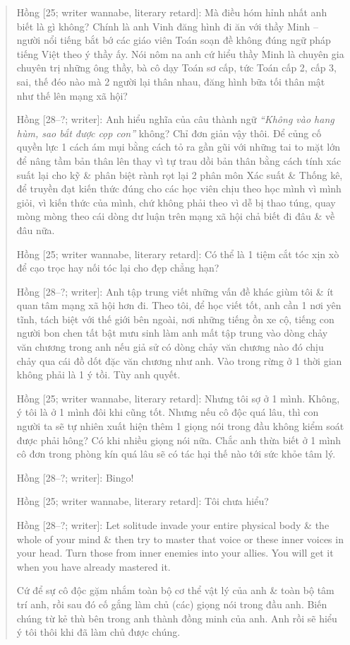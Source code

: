 \documentclass[12pt]{article}
\begin{document}
\begin{quote}
	{\sf Hồng [25; writer wannabe, literary retard]}: Mà điều hóm hỉnh nhất anh biết là gì không? Chính là anh Vinh đăng hình đi ăn với thầy Minh -- người nổi tiếng bắt bớ các giáo viên Toán soạn đề không đúng ngữ pháp tiếng Việt theo ý thầy ấy. Nói nôm na anh cứ hiểu thầy Minh là chuyên gia chuyên trị những ông thầy, bà cô dạy Toán sơ cấp, tức Toán cấp 2, cấp 3, sai, thế đéo nào mà 2 người lại thân nhau, đăng hình bữa tối thân mật như thế lên mạng xã hội?
	
	{\sf Hồng [28--?; writer]}: Anh hiểu nghĩa của câu thành ngữ {\it ``Không vào hang hùm, sao bắt được cọp con''} không? Chỉ đơn giản vậy thôi. Để củng cố quyền lực 1 cách ám mụi bằng cách tỏ ra gần gũi với những tai to mặt lớn để nâng tầm bản thân lên thay vì tự trau dồi bản thân bằng cách tính xác suất lại cho kỹ \& phân biệt rành rọt lại 2 phân môn Xác suất \& Thống kê, để truyền đạt kiến thức đúng cho các học viên chịu theo học mình vì mình giỏi, vì kiến thức của mình, chứ không phải theo vì dễ bị thao túng, quay mòng mòng theo cái dòng dư luận trên mạng xã hội chả biết đi đâu \& về đâu nữa.
	
	{\sf Hồng [25; writer wannabe, literary retard]}: Có thể là 1 tiệm cắt tóc xịn xò để cạo trọc hay nối tóc lại cho đẹp chẳng hạn?
	
	{\sf Hồng [28--?; writer]}: Anh tập trung viết những vấn đề khác giùm tôi \& ít quan tâm mạng xã hội hơn đi. Theo tôi, để học viết tốt, anh cần 1 nơi yên tĩnh, tách biệt với thế giới bên ngoài, nơi những tiếng ồn xe cộ, tiếng con người bon chen tất bật mưu sinh làm anh mất tập trung vào dòng chảy văn chương trong anh nếu giả sử có dòng chảy văn chương nào đó chịu chảy qua cái đồ dốt đặc văn chương như anh. Vào trong rừng ở 1 thời gian không phải là 1 ý tồi. Tùy anh quyết.
	
	{\sf Hồng [25; writer wannabe, literary retard]}: Nhưng tôi sợ ở 1 mình. Không, ý tôi là ở 1 mình đôi khi cũng tốt. Nhưng nếu cô độc quá lâu, thì con người ta sẽ tự nhiên xuất hiện thêm 1 giọng nói trong đầu không kiểm soát được phải hông? Có khi nhiều giọng nói nữa. Chắc anh thừa biết ở 1 mình cô đơn trong phòng kín quá lâu sẽ có tác hại thế nào tới sức khỏe tâm lý.
	
	{\sf Hồng [28--?; writer]}: Bingo!
	
	{\sf Hồng [25; writer wannabe, literary retard]}: Tôi chưa hiểu?
	
	{\sf Hồng [28--?; writer]}: Let solitude invade your entire physical body \& the whole of your mind \& then try to master that voice or these inner voices in your head. Turn those from inner enemies into your allies. You will get it when you have already mastered it.
	
	Cứ để sự cô độc gặm nhắm toàn bộ cơ thể vật lý của anh \& toàn bộ tâm trí anh, rồi sau đó cố gắng làm chủ (các) giọng nói trong đầu anh. Biến chúng từ kẻ thù bên trong anh thành đồng minh của anh. Anh rồi sẽ hiểu ý tôi thôi khi đã làm chủ được chúng.
\end{quote}
\end{document}
